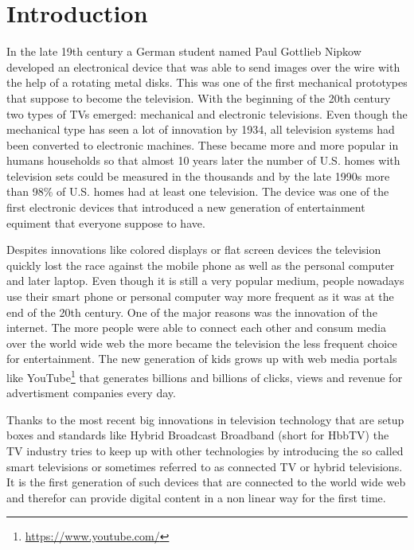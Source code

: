 %

\chapter{Introduction\label{cha:introduction}}

In the late 19th century a German student named Paul Gottlieb Nipkow developed an electronical device
that was able to send images over the wire with the help of a rotating metal disks. This was one of the first
mechanical prototypes that suppose to become the television. With the beginning of the 20th century two types
of TVs emerged: mechanical and electronic televisions. Even though the mechanical type has seen a lot of
innovation by 1934, all television systems had been converted to electronic machines. These became more and
more popular in humans households so that almost 10 years later the number of U.S. homes with television sets
could be measured in the thousands and by the late 1990s more than 98\% of U.S. homes had at least one
television. The device was one of the first electronic devices that introduced a new generation of entertainment
equiment that everyone suppose to have.

Despites innovations like colored displays or flat screen devices the television quickly lost the race against
the mobile phone as well as the personal computer and later laptop. Even though it is still a very popular
medium, people nowadays use their smart phone or personal computer way more frequent as it was at the end of the
20th century. One of the major reasons was the innovation of the internet. The more people were able to connect
each other and consum media over the world wide web the more became the television the less frequent choice for
entertainment. The new generation of kids grows up with web media portals like YouTube\footnote{\url{https://www.youtube.com/}}
that generates billions and billions of clicks, views and revenue for advertisment companies every day.

Thanks to the most recent big innovations in television technology that are setup boxes and standards like
Hybrid Broadcast Broadband (short for HbbTV) the TV industry tries to keep up with other technologies by
introducing the so called smart televisions or sometimes referred to as connected TV or hybrid televisions.
It is the first generation of such devices that are connected to the world wide web and therefor can provide
digital content in a non linear way for the first time.

